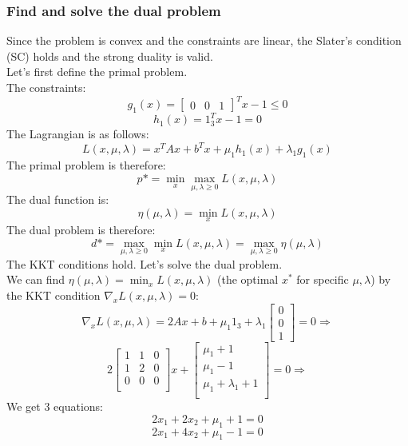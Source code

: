 \documentclass[12pt]{article}
\begin{document}
\subsubsection{Find and solve the dual problem}
Since the problem is convex and the constraints are linear, the Slater's condition (SC) holds and the strong duality is valid.\\
Let's first define the primal problem.\\
The constraints:\\
$$g_1(x)=\begin{bmatrix}  0 & 0 & 1 \end{bmatrix}^T x - 1\leq 0$$
$$h_1(x)=1^T_3 x - 1 = 0$$
The Lagrangian is as follows:\\
$$L(x,\mu,\lambda)=x^T A x + b^T x + \mu_1 h_1(x) + \lambda_1 g_1(x)$$
The primal problem is therefore:
$$p* = \min _x \max _{\mu,\lambda \geq 0} L(x,\mu,\lambda)$$
The dual function is:
$$\eta(\mu,\lambda) = \min _x L(x,\mu,\lambda) $$
The dual problem is therefore:
$$d* =  \max _{\mu,\lambda \geq 0} \min _x L(x,\mu,\lambda) = \max _{\mu,\lambda \geq 0} \eta(\mu,\lambda)$$
The KKT conditions hold. Let's solve the dual problem.\\
We can find $\eta(\mu,\lambda) = \min _x L(x,\mu,\lambda)$ (the optimal $x^*$ for specific $\mu,\lambda$) by the KKT condition $\nabla_x L(x,\mu,\lambda) = 0$:
$$\nabla_x L(x,\mu,\lambda) = 2Ax + b + \mu_1 1_3 + \lambda_1 \begin{bmatrix}  0 \\ 0 \\ 1 \end{bmatrix} = 0 \Rightarrow$$
$$ 2 \begin{bmatrix} 1 & 1 & 0 \\ 1 & 2 & 0 \\ 0 & 0 & 0 \\ \end{bmatrix} x + 
\begin{bmatrix}  \mu_1 + 1 \\ \mu_1 - 1 \\ \mu_1 + \lambda_1 + 1\\ \end{bmatrix} = 0 \Rightarrow$$
We get 3 equations:\\
\setcounter{equation}{0}
\begin{equation}
2x_1 + 2x_2 +\mu_1 + 1 = 0
\end{equation}
\begin{equation}
2x_1 + 4x_2 +\mu_1 - 1 = 0
\end{equation}
\end{document}
